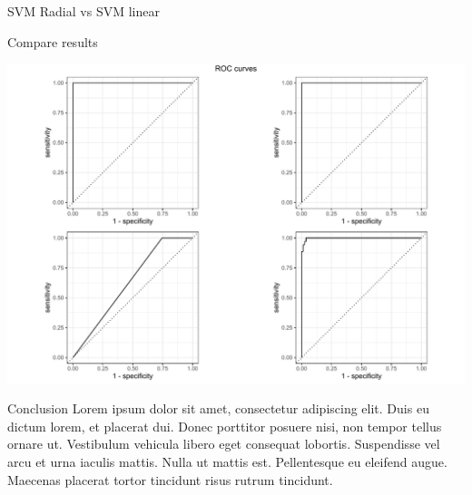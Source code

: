 \documentclass[
  ignorenonframetext,
]{article}
\begin{document}
\begin{frame}[fragile]{SVM Radial vs SVM linear}
\begin{block}{Compare results}
\begin{center}\includegraphics{_main_files/figure-beamer/unnamed-chunk-85-1} \end{center}
\end{block}

\begin{block}{Conclusion}
\protect\hypertarget{conclusion-5}{}
Lorem ipsum dolor sit amet, consectetur adipiscing elit. Duis eu dictum lorem, et placerat dui. Donec porttitor posuere nisi, non tempor tellus ornare ut. Vestibulum vehicula libero eget consequat lobortis. Suspendisse vel arcu et urna iaculis mattis. Nulla ut mattis est. Pellentesque eu eleifend augue. Maecenas placerat tortor tincidunt risus rutrum tincidunt.
\end{block}
\end{frame}
\end{document}
